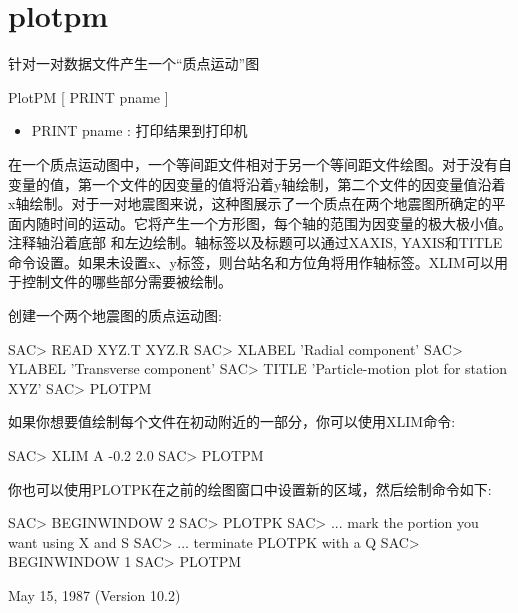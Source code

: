 \section{plotpm}
\label{cmd:plotpm}

针对一对数据文件产生一个``质点运动''图

PlotPM [ PRINT pname ]

\begin{itemize}
\item PRINT pname : 打印结果到打印机
\end{itemize}

在一个质点运动图中，一个等间距文件相对于另一个等间距文件绘图。对于没有自变量的值，第一个文件的因变量的值将沿着y轴绘制，第二个文件的因变量值沿着x轴绘制。对于一对地震图来说，这种图展示了一个质点在两个地震图所确定的平面内随时间的运动。它将产生一个方形图，每个轴的范围为因变量的极大极小值。注释轴沿着底部	和左边绘制。轴标签以及标题可以通过XAXIS, YAXIS和TITLE命令设置。如果未设置x、y标签，则台站名和方位角将用作轴标签。XLIM可以用于控制文件的哪些部分需要被绘制。

创建一个两个地震图的质点运动图:
\begin{SACCode}
SAC> READ XYZ.T XYZ.R
SAC> XLABEL 'Radial component'
SAC> YLABEL 'Transverse component'
SAC> TITLE 'Particle-motion plot for station XYZ'
SAC> PLOTPM
\end{SACCode}

如果你想要值绘制每个文件在初动附近的一部分，你可以使用XLIM命令:
\begin{SACCode}
SAC>  XLIM A -0.2 2.0
SAC>  PLOTPM
\end{SACCode}
你也可以使用PLOTPK在之前的绘图窗口中设置新的区域，然后绘制命令如下:

\begin{SACCode}
SAC> BEGINWINDOW 2
SAC> PLOTPK
SAC> ... mark the portion you want using X and S
SAC> ... terminate PLOTPK with a Q
SAC> BEGINWINDOW 1
SAC> PLOTPM
\end{SACCode}

May 15, 1987 (Version 10.2)
